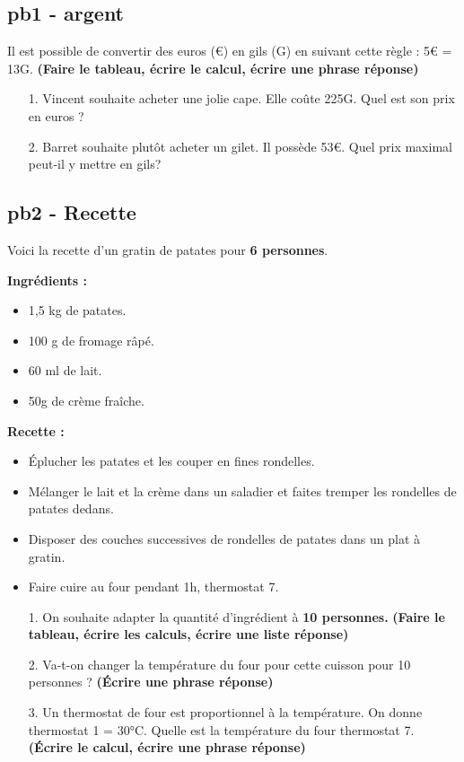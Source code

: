 \documentclass[11pt]{article}
\begin{document}
\subsection*{pb1 - argent}
Il est possible de convertir des euros (€) en gils (G) en suivant cette règle : 5€ = 13G.
\textbf{(Faire le tableau, écrire le calcul, écrire une phrase réponse)}

\begin{enumerate}
  \item[1.] Vincent souhaite acheter une jolie cape. Elle coûte 225G. Quel est son prix en euros ? 
  \item[2.] Barret souhaite plutôt acheter un gilet. Il possède 53€. Quel prix maximal peut-il y mettre en gils?
\end{enumerate}

\subsection*{pb2 - Recette}
Voici la recette d'un gratin de patates pour \textbf{6 personnes}. 

\begin{minipage}[t]{0.45\textwidth}
  \textbf{Ingrédients : }
  \begin{itemize}
    \item 1,5 kg de patates.
    \item 100 g de fromage râpé.
    \item 60 ml de lait.
    \item 50g de crème fraîche.
  \end{itemize}

\end{minipage}
\begin{minipage}[t]{0.5\textwidth}
  \textbf{Recette :}
  \begin{itemize}
    \item Éplucher les patates et les couper en fines rondelles.
    \item Mélanger le lait et la crème dans un saladier et faites tremper les rondelles de patates dedans.
    \item Disposer des couches successives de rondelles de patates dans un plat à gratin. 
    \item Faire cuire au four pendant 1h, thermostat 7.
  \end{itemize}
\end{minipage}

\begin{enumerate}
  \item[1.] On souhaite adapter la quantité d'ingrédient à \textbf{10 personnes.} \textbf{(Faire le tableau, écrire les calculs, écrire une liste réponse)}
  \item[2.] Va-t-on changer la température du four pour cette cuisson pour 10 personnes ?  \textbf{(Écrire une phrase réponse)}
  \item[3.] Un thermostat de four est proportionnel à la température. On donne thermostat 1 = 30°C. Quelle est la température du four thermostat 7. \textbf{(Écrire le calcul, écrire une phrase réponse)} 
\end{enumerate}
\end{document}
